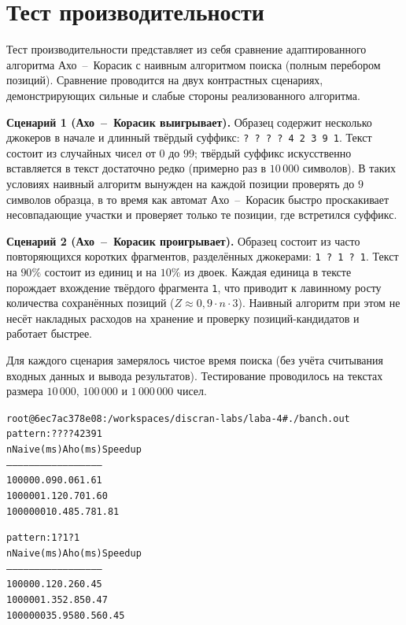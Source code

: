 \section{Тест производительности}

Тест производительности представляет из себя сравнение адаптированного
алгоритма Ахо~--~Корасик с наивным алгоритмом поиска (полным перебором
позиций). Сравнение проводится на двух контрастных сценариях,
демонстрирующих сильные и слабые стороны реализованного алгоритма.

\textbf{Сценарий 1 (Ахо~--~Корасик выигрывает).}
Образец содержит несколько джокеров в начале и длинный твёрдый суффикс:
\texttt{? ? ? ? 4 2 3 9 1}. Текст состоит из случайных чисел от $0$ до
$99$; твёрдый суффикс искусственно вставляется в текст достаточно
редко (примерно раз в $10\,000$ символов). В таких условиях наивный
алгоритм вынужден на каждой позиции проверять до $9$ символов образца,
в то время как автомат Ахо~--~Корасик быстро проскакивает несовпадающие
участки и проверяет только те позиции, где встретился суффикс.

\textbf{Сценарий 2 (Ахо~--~Корасик проигрывает).}
Образец состоит из часто повторяющихся коротких фрагментов,
разделённых джокерами: \texttt{1 ? 1 ? 1}. Текст на $90\%$ состоит из
единиц и на $10\%$ из двоек. Каждая единица в тексте порождает
вхождение твёрдого фрагмента \texttt{1}, что приводит к лавинному
росту количества сохранённых позиций ($Z \approx 0{,}9 \cdot n \cdot 3$).
Наивный алгоритм при этом не несёт накладных расходов на хранение
и проверку позиций-кандидатов и работает быстрее.

Для каждого сценария замерялось чистое время поиска (без учёта
считывания входных данных и вывода результатов). Тестирование
проводилось на текстах размера $10\,000$, $100\,000$ и $1\,000\,000$
чисел.

\begin{alltt}
root@6ec7ac378e08:/workspaces/discran-labs/laba-4# ./banch.out
pattern: ? ? ? ? 4 2 3 9 1
n           Naive (ms)    Aho (ms)      Speedup
--------------------------------------------------
10000       0.09          0.06          1.61
100000      1.12          0.70          1.60
1000000     10.48         5.78          1.81

pattern: 1 ? 1 ? 1
n           Naive (ms)    Aho (ms)      Speedup
--------------------------------------------------
10000       0.12          0.26          0.45
100000      1.35          2.85          0.47
1000000     35.95         80.56         0.45
\end{alltt}

